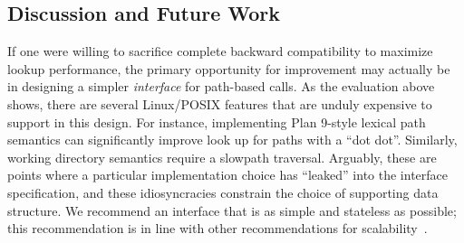 \subsection{Discussion and Future Work}

If one were willing to sacrifice complete backward compatibility to maximize lookup performance,
the primary opportunity for improvement may actually be in designing a simpler 
{\em interface} for path-based calls.
As the evaluation above shows, there are several Linux/POSIX features
that are unduly expensive to support in this design.
For instance, implementing Plan 9-style lexical path semantics
can significantly improve look up for paths with a ``dot dot''.
Similarly, working directory semantics require
a slowpath traversal.
Arguably, these are points where a particular implementation choice
has ``leaked'' into the interface specification,
and these idiosyncracies constrain the choice of supporting data structure.
We recommend an interface that is as simple and stateless as possible; 
this recommendation is in line with other recommendations for scalability~\citep{clements13scalable}.

